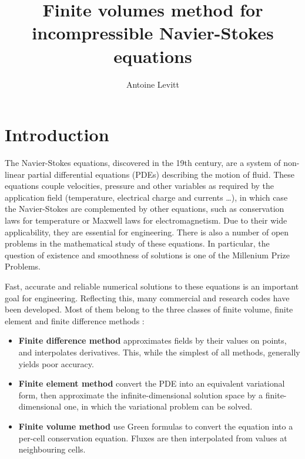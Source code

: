 \documentclass[12pt]{article}
\begin{document}
\author{Antoine Levitt}
\title{Finite volumes method for incompressible Navier-Stokes equations}
\maketitle
{}
\newpage
\tableofcontents
\newpage

\section{Introduction}
The Navier-Stokes equations, discovered in the 19th century, are a
system of non-linear partial differential equations (PDEs) describing
the motion of fluid. These equations couple velocities, pressure and
other variables as required by the application field (temperature,
electrical charge and currents \dots), in which case the Navier-Stokes
are complemented by other equations, such as conservation laws for
temperature or Maxwell laws for electromagnetism. Due to their wide
applicability, they are essential for engineering. There is also a
number of open problems in the mathematical study of these
equations. In particular, the question of existence and smoothness of
solutions is one of the Millenium Prize Problems.

Fast, accurate and reliable numerical solutions to these equations is
an important goal for engineering. Reflecting this, many commercial
and research codes have been developed. Most of them belong to the
three classes of finite volume, finite element and finite difference
methods :

\begin{itemize}
\item {\bf Finite difference method} approximates fields by their
  values on points, and interpolates derivatives. This, while the
  simplest of all methods, generally yields poor accuracy.

\item {\bf Finite element method} convert the PDE into an equivalent
  variational form, then approximate the infinite-dimensional solution
  space by a finite-dimensional one, in which the variational problem
  can be solved.

\item {\bf Finite volume method} use Green formulas to convert the
  equation into a per-cell conservation equation. Fluxes are then
  interpolated from values at neighbouring cells.
\end{itemize}
\end{document}
